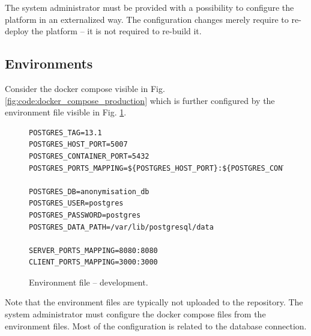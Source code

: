 \documentclass[a4paper,twoside,12pt]{book}
\begin{document}
The system administrator must be provided with a possibility to configure the platform in an externalized way. The configuration changes merely require to re-deploy the platform -- it is not required to re-build it.

\subsection{Environments}

Consider the docker compose visible in Fig. \ref{fig:code:docker_compose_production} which is further configured by the environment file visible in Fig. \ref{fig:code:environment_production}.

\begin{figure}[H]
\begin{verbatim}
POSTGRES_TAG=13.1
POSTGRES_HOST_PORT=5007
POSTGRES_CONTAINER_PORT=5432
POSTGRES_PORTS_MAPPING=${POSTGRES_HOST_PORT}:${POSTGRES_CONTAINER_PORT}

POSTGRES_DB=anonymisation_db
POSTGRES_USER=postgres
POSTGRES_PASSWORD=postgres
POSTGRES_DATA_PATH=/var/lib/postgresql/data

SERVER_PORTS_MAPPING=8080:8080
CLIENT_PORTS_MAPPING=3000:3000
\end{verbatim}
\caption{Environment file – development.}
\label{fig:code:environment_production}
\end{figure}

Note that the environment files are typically not uploaded to the repository. The system administrator must configure the docker compose files from the environment files. Most of the configuration is related to the database connection.
\end{document}
